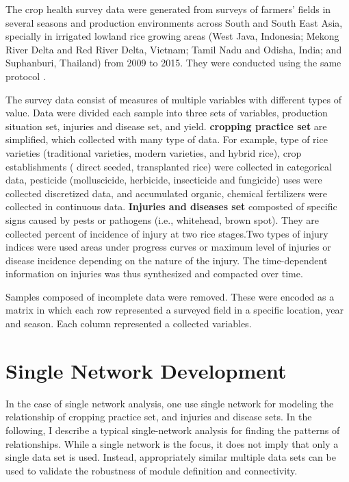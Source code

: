 The crop health survey data were generated from surveys of farmers' fields in several seasons and production environments across South and South East Asia, specially in irrigated lowland rice growing areas (West Java, Indonesia; Mekong River Delta and Red River Delta, Vietnam; Tamil Nadu and Odisha, India; and Suphanburi, Thailand) from 2009 to 2015. They were conducted using the same protocol \cite{Savary:1996ud}. 

The survey data consist of measures of multiple variables with different types of value. Data were divided each sample into three sets of variables, production situation set, injuries and disease set, and yield. \textbf{cropping practice set} are simplified, which collected with many type of data. For example, type of rice varieties (traditional varieties, modern varieties, and hybrid rice), crop establishments ( direct seeded, transplanted rice) were collected in categorical data, pesticide (molluscicide, herbicide, insecticide and fungicide) uses were collected discretized data, and accumulated organic, chemical fertilizers were collected in continuous data. \textbf{Injuries and diseases set} composted of specific signs caused by pests or pathogens (i.e., whitehead, brown spot). They are collected percent of incidence of injury at two rice stages.Two types of injury indices were used areas under progress curves or maximum level of injuries or disease incidence depending on the nature of the injury. The time-dependent information on injuries was thus synthesized and compacted over time.

Samples composed of incomplete data were removed. These were encoded as a matrix in which each row represented a surveyed field in a specific location, year and season. Each column represented a collected variables.


\section*{Single Network Development}


In the case of single network analysis, one use single network for modeling the relationship of cropping practice set, and injuries and disease sets. In the following, I describe a typical single-network analysis for finding the patterns of relationships.
While a single network is the focus, it does not imply that only a single data set is used. Instead, appropriately similar multiple data sets can be used to validate the robustness of module definition and connectivity.

